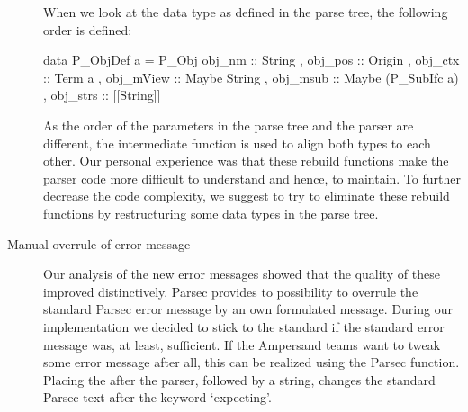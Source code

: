 \begin{description}
   When we look at the data type as defined in the parse tree, the following order is defined:
   \begin{haskell}
 data P_ObjDef a =
    P_Obj { obj_nm :: String          
               , obj_pos :: Origin  
               , obj_ctx :: Term a
               , obj_mView :: Maybe String 
               , obj_msub :: Maybe (P_SubIfc a)  
               , obj_strs :: [[String]]
               }
    \end{haskell}

    As the order of the parameters in the parse tree and the parser are different, the intermediate function  is used to align both types to each other.
   Our personal experience was that these rebuild functions make the parser code more difficult to understand and hence, to maintain.
   To further decrease the code complexity, we suggest to try to eliminate these rebuild functions by restructuring some data types in the parse tree.

  \item[Manual overrule of error message]
    Our analysis of the new error messages showed that the quality of these improved distinctively.
    Parsec provides to possibility to overrule the standard Parsec error message by an own formulated message.
    During our implementation we decided to stick to the standard if the standard error message was, at least, sufficient.
    If the Ampersand teams want to tweak some error message after all, this can be realized using the  Parsec function.
    Placing the  after the parser, followed by a string, changes the standard Parsec text after the keyword `expecting'.

\end{description}
